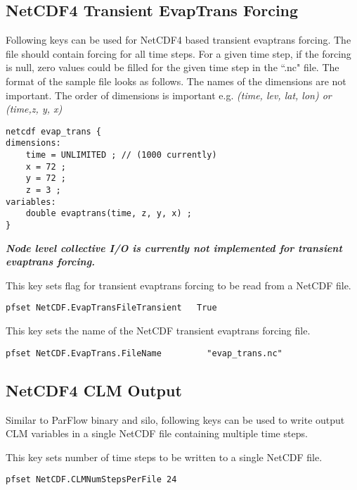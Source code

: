 \subsection{NetCDF4 Transient EvapTrans Forcing}
Following keys can be used for NetCDF4 based transient evaptrans forcing. The file should contain forcing for all time steps. For a given time step, if the forcing is null, zero values could be filled for the given time step in the ``.nc" file. The format of the sample file looks as follows. The names of the dimensions are not important. The order of dimensions is important e.g. \textit{(time, lev, lat, lon) or (time,z, y, x)}
\begin{display}\begin{verbatim}
netcdf evap_trans {
dimensions:
	time = UNLIMITED ; // (1000 currently)
	x = 72 ;
	y = 72 ;
	z = 3 ;
variables:
	double evaptrans(time, z, y, x) ;
}
\end{verbatim}\end{display}
\textit{\textbf{Node level collective I/O is currently not implemented for transient evaptrans forcing.}}

{This key sets flag for transient evaptrans forcing to be read from a NetCDF file.}
\begin{display}\begin{verbatim}
pfset NetCDF.EvapTransFileTransient   True
\end{verbatim}\end{display}

{This key sets the name of the NetCDF transient evaptrans forcing file.}
\begin{display}\begin{verbatim}
pfset NetCDF.EvapTrans.FileName         "evap_trans.nc"
\end{verbatim}\end{display}

\subsection{NetCDF4 CLM Output}
Similar to ParFlow binary and silo, following keys can be used to write output CLM variables in a single NetCDF file containing multiple time steps.

{This key sets number of time steps to be written to a single NetCDF file.}
\begin{display}\begin{verbatim}
pfset NetCDF.CLMNumStepsPerFile 24
\end{verbatim}\end{display}

